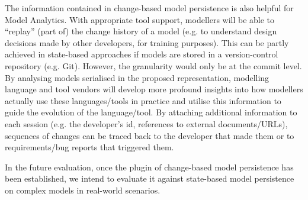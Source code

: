 The information contained in change-based model persistence is also helpful for Model Analytics. With appropriate tool support, modellers will be able to ``replay'' (part of) the change history of a model (e.g. to understand design decisions made by other developers, for training purposes). This can be partly achieved in state-based approaches if models are stored in a version-control repository (e.g. Git). However, the granularity would only be at the commit level. By analysing models serialised in the proposed representation, modelling language and tool vendors will develop more profound insights into how modellers actually use these languages/tools in practice and utilise this information to guide the evolution of the language/tool. By attaching additional information to each session (e.g. the developer's id, references to external documents/URLs), sequences of changes can be traced back to the developer that made them or to requirements/bug reports that triggered them.

In the future evaluation, once the plugin of change-based model persistence has been established, we intend to evaluate it against state-based model persistence on complex models in real-world scenarios.

